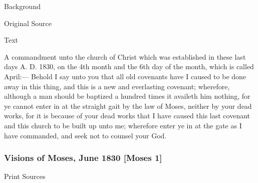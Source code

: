 			\begin{description}
				\item[Background]
			\end{description}
			
			
			\begin{description}
				\item[Original Source]
			\end{description}
			
			
			\begin{description}
				\item[Text]
			\end{description}
			
				A commandment unto the church of Christ which was established in these last days A. D. 1830, on the 4th month and the 6th day of the month, which is called April:--- Behold I say unto you that all old covenants have I caused to be done away in this thing, and this is a new and everlasting covenant; wherefore, although a man should be baptized a hundred times it availeth him nothing, for ye cannot enter in at the straight gait by the law of Moses, neither by your dead works, for it is because of your dead works that I have caused this last covenant and this church to be built up unto me; wherefore enter ye in at the gate as I have commanded, and seek not to counsel your God.
				
		\subsubsection{Visions of Moses, June 1830 [Moses 1]}
			\label{EMS-1830-JS-JUN-1830}
		
			\begin{description}
				\item[Print Sources]
			\end{description}

